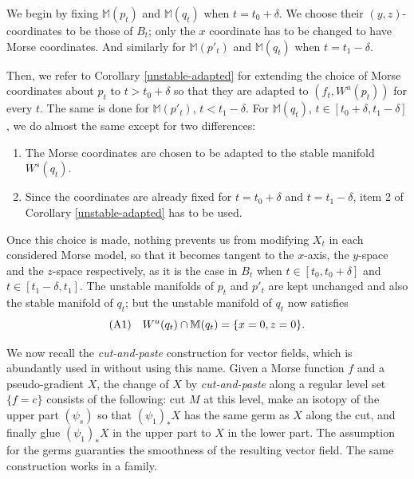 \documentclass[12pt]{amsart}
\def\M{\mathbb{M}}
\def\de{\delta}
\begin{document}
   We begin by  fixing $\M(p_t)$ and $\M(q_t)$ when $t = t_0+\de$. We choose  their 
    $(y,z)$-coordinates %
    to be those of $B_t$; only the $x$ coordinate has to be changed to have Morse coordinates. 
    And similarly for  $\M(p'_t)$ and $\M(q_t)$ when $t = t_1-\de$.
   
   
    Then, we refer to Corollary \ref{unstable-adapted} for extending 
    the choice of  Morse coordinates about $p_t$ to $t>t_0+\de$ 
    so that they are adapted to $\left(f_t, W^u(p_t)\right)$ for every $t$.
    The same is done for $\M(p'_t)$, $t< t_1-\de$.
    For  $\M(q_t)$, $t\in [t_0+\de,t_1-\de]$, we do almost the same except for two differences: 
    \begin{enumerate}
    \item The Morse coordinates are chosen to be  adapted to the stable manifold $W^s(q_t)$.
    \item Since the coordinates 
    are already fixed for $t=t_0+\de$ and $t=t_1-\de$,  item 2 of Corollary \ref{unstable-adapted}
    has to be used.
    \end{enumerate}
    
    Once this choice is made, nothing prevents us from modifying $X_t$ in each  considered Morse model,
    so that it becomes tangent to the $x$-axis,
    the $y$-space and the $z$-space respectively,  as it is the case 
    in $B_t$ when $t\in [t_0, t_0+\de]$ and  $t\in [t_1-\de, t_1]$. The unstable manifolds of $p_t$ and $p'_t$
    are kept unchanged and also the stable manifold of $q_t$; but  the unstable manifold of  $q_t$
    now satisfies
    $$ {\rm (A1)} \quad W^u(q_t)\cap \M(q_t)= \{x=0, z=0\}.$$
     
    
    We now recall the {\it cut-and-paste} construction for vector fields, which is abundantly used
   in \cite{h-cob} without using this name.
    Given a Morse function $f$ and a pseudo-gradient $X$, the change of $X$ by {\it 
    cut-and-paste} along a regular  level set $\{f=c\}$ consists of the following:
     cut $M$ at this level, make an isotopy of the upper part
    $\left(\psi_s\right)$ so that $(\psi_1)_*X$ has the same germ as $X$ along the cut, and finally
    glue  $(\psi_1)_*X$ in the upper part to $X$ in the lower part. The assumption for the germs  
    guaranties the smoothness of the resulting vector field. The same construction works in a family.
    
\end{document}
